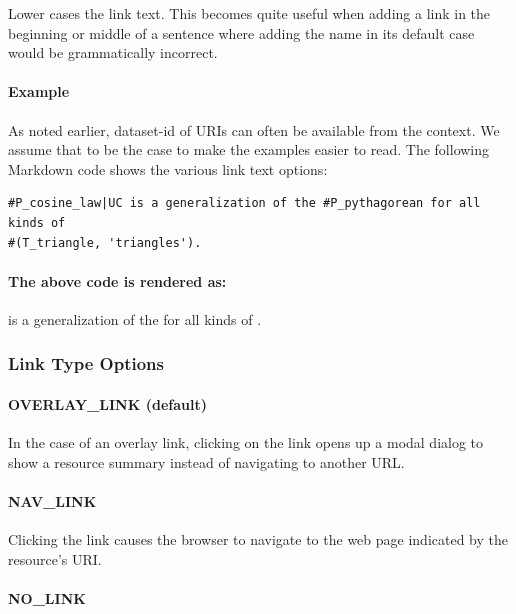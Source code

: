 \documentclass[a4paper]{article}
\begin{document}
Lower cases the link text. This becomes quite useful when adding a link in the beginning or middle of a sentence where adding the name in its default case would be grammatically incorrect.

\paragraph{Example}
As noted earlier, dataset-id of URIs can often be available from the context. We assume that to be the case to make the examples easier to read.
The following Markdown code shows the various link text options:

\begin{verbatim}
#P_cosine_law|UC is a generalization of the #P_pythagorean for all kinds of
#(T_triangle, 'triangles').
\end{verbatim}

\paragraph{The above code is rendered as:}
\begin{mdframed}
 is a generalization of the  for all kinds of .
\end{mdframed}

\subsubsection{Link Type Options}

\paragraph{OVERLAY\_LINK (default)}

In the case of an overlay link, clicking on the link opens up a modal dialog to show a resource summary instead of navigating to another URL.

\paragraph{NAV\_LINK}

Clicking the link causes the browser to navigate to the web page indicated by the resource's URI.

\paragraph{NO\_LINK}
\end{document}
